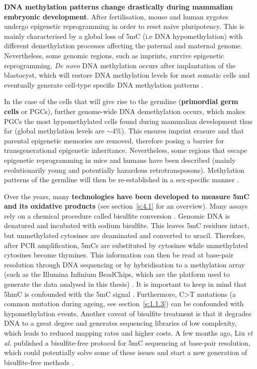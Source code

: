 \bigskip

\textbf{DNA methylation patterns change drastically during mammalian embryonic development}. After fertilisation, mouse and human zygotes undergo epigenetic reprogramming in order to reset naive pluripotency. This is mainly characterised by a global loss of 5mC (i.e DNA hypomethylation) with different demethylation processes affecting the paternal and maternal genome. Nevertheless, some genomic regions, such as imprints, survive epigenetic reprogramming. \textit{De novo} DNA methylation occurs after implantation of the blastocyst, which will restore DNA methylation levels for most somatic cells and eventually generate cell-type specific DNA methylation patterns \citep{Iurlaro2017,Tang2016,Atlasi2017}. 

\bigskip

In the case of the cells that will give rise to the germline (\textbf{primordial germ cells} or \acrshort{PGCs}), further genome-wide DNA demethylation occurs, which makes \acrshort{PGCs} the most hypomethylated cells found during mammalian development thus far (global methylation levels are $\sim$4\%). This ensures imprint erasure and that parental epigenetic memories are removed, therefore posing a barrier for transgenerational epigenetic inheritance. Nevertheless, some regions that escape epigenetic reprogramming in mice and humans have been described (mainly evolutionarily young and potentially hazardous retrotransposons). Methylation patterns of the germline will then be re-established in a sex-specific manner \citep{Tang2016}.  

\bigskip

Over the years, many \textbf{technologies have been developed to measure 5mC and its oxidative products} (see section~\ref{s:4.1} for an overview). Many assays rely on a chemical procedure called bisulfite conversion \citep{Frommer1992}. Genomic DNA is denatured and incubated with sodium bisulfite. This leaves 5mC residues intact, but unmethylated cytosines are deaminated and converted to uracil. Therefore, after PCR amplification, 5mCs are substituted by cytosines while unmethylated cytosines become thymines. This information can then be read at base-pair resolution through DNA sequencing or by hybridisation to a methylation array (such as the Illumina Infinium BeadChips, which are the platform used to generate the data analysed in this thesis) \citep{Plongthongkum2014}. It is important to keep in mind that 5hmC is confounded with the 5mC signal \citep{Wu2017}. Furthermore, C>T mutations (a common mutation during ageing, see section~\ref{s:1.1.3}) can be confounded with hypomethylation events. Another caveat of bisulfite treatment is that it degrades DNA to a great degree and generates sequencing libraries of low complexity, which leads to reduced mapping rates and higher costs. A few months ago, Liu \textit{et al.} published a bisulfite-free protocol for 5mC sequencing at base-pair resolution, which could potentially solve some of these issues and start a new generation of bisulfite-free methods \citep{Liu2019}. 

